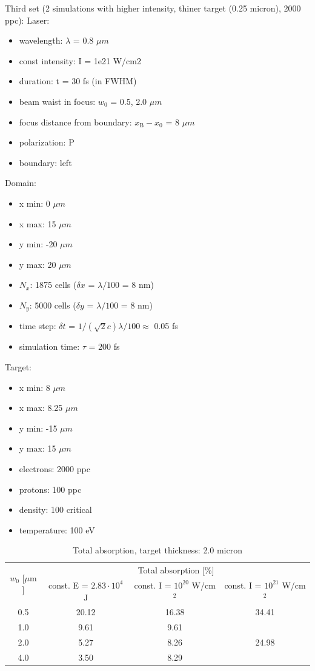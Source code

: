 \noindent
Third set (2 simulations with higher intensity, thiner target (0.25 micron), 2000 ppc):
\noindent
Laser:
\begin{itemize}
	\item wavelength: $ \lambda $ = 0.8 $ \mu m $
	\item const intensity: I = 1e21 W/cm2
	\item duration: t = 30 fs (in FWHM)
	\item beam waist in focus: $ w_0 $ = 0.5, 2.0 $ \mu m $
	\item focus distance from boundary: $ x_\mathrm{B} - x_0 $ = 8 $ \mu m $
	\item polarization: P
	\item boundary: left 
\end{itemize}
Domain:
\begin{itemize}
	\item x min: 0 $ \mu m $
	\item x max: 15 $ \mu m $
	\item y min: -20 $ \mu m $
	\item y max: 20 $ \mu m $
	\item $ N_x $: 1875 cells ($ \delta x $ = $ \lambda/100 $ = 8 nm)
	\item $ N_y $: 5000 cells ($ \delta y $ = $ \lambda/100 $ = 8 nm)
	\item time step: $ \delta t $ = $ 1/(\sqrt{2} c) \lambda /100 \approx $ 0.05 fs 
	\item simulation time: $ \tau $ = 200 fs
\end{itemize}
Target:
\begin{itemize}
	\item x min: 8 $ \mu m $
	\item x max: 8.25 $ \mu m $
	\item y min: -15 $ \mu m $
	\item y max: 15 $ \mu m $
	\item electrons: 2000 ppc
	\item protons: 100 ppc
	\item density: 100 critical
	\item temperature: 100 eV
\end{itemize}

\begingroup
\renewcommand*{\arraystretch}{1.5}
\begin{table}[h!]
	\centering
	\begin{tabular}{c | c | c | c}
		\multirow{2}{*}{$ w_0 $ [$ \mu\mathrm{m} $]} & \multicolumn{3}{c}{Total absorption [\%]} \\ \cline{2-4}
		 & const. E = $ 2.83 \cdot 10^{4} $ J & const. I = $ 10^{20} $ W/cm$^2$ & const. I = $ 10^{21} $ W/cm$^2$ \\ \hline \hline
		0.5 & 20.12 & 16.38 & 34.41 \\ \hline
		1.0 & 9.61 & 9.61 & \\ \hline
		2.0 & 5.27 & 8.26 & 24.98 \\ \hline
		4.0 & 3.50 & 8.29 & \\
	\end{tabular}
	\caption{Total absorption, target thickness: 2.0 micron}
	\label{table:4}
\end{table}
\endgroup

